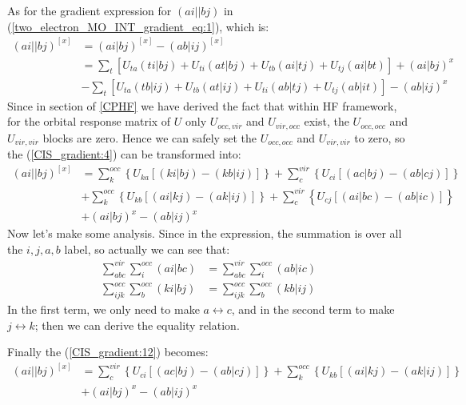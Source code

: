 As for the gradient expression for $(ai||bj)$ in
(\ref{two_electron_MO_INT_gradient_eq:1}), which is:
\begin{align}
 \label{CIS_gradient:4}
(ai||bj)^{[x]} &= (ai|bj)^{[x]} - (ab|ij)^{[x]} \nonumber \\
&= \sum_{t}\left[ 
U_{ta}(ti|bj) +
U_{ti}(at|bj) + 
U_{tb}(ai|tj) + 
U_{tj}(ai|bt)  
\right] + (ai|bj)^{x} \nonumber \\
&-
\sum_{t}\left[ 
U_{ta}(tb|ij) +
U_{tb}(at|ij) + 
U_{ti}(ab|tj) + 
U_{tj}(ab|it)  
\right] - (ab|ij)^{x} 
\end{align}
Since in section of \ref{CPHF} we have derived the fact that within HF
framework, for the orbital response matrix of $U$ only $U_{occ, vir}$ and
$U_{vir, occ}$ exist, the $U_{occ,occ}$ and $U_{vir, vir}$ blocks are zero.
Hence we can safely set the $U_{occ,occ}$ and $U_{vir, vir}$ to zero, so the
(\ref{CIS_gradient:4}) can be transformed into:
\begin{equation}
\begin{split}
(ai||bj)^{[x]} &=
\sum_{k}^{occ}\left\{ U_{ka}\left[(ki|bj) - (kb|ij)\right] \right\} +
\sum_{c}^{vir}\left\{ U_{ci}\left[(ac|bj) - (ab|cj)\right] \right\} \nonumber
\\
&+\sum_{k}^{occ}\left\{ U_{kb}\left[(ai|kj)-(ak|ij)\right] \right\} +
\sum_{c}^{vir}\left\{ U_{cj}\left[(ai|bc)  - (ab|ic)\right] \right\} 
\nonumber \\
&+  (ai|bj)^{x} - (ab|ij)^{x}
\end{split}
 \label{CIS_gradient:12}
\end{equation}
Now let's make some analysis. Since in the expression, the summation is over
all the $i,j,a,b$ label, so actually we can see that:
\begin{align}
\sum_{abc}^{vir}\sum_{i}^{occ}(ai|bc)  &= \sum_{abc}^{vir}\sum_{i}^{occ}(ab|ic)
\nonumber \\
\sum_{ijk}^{occ}\sum_{b}^{occ}(ki|bj) &= \sum_{ijk}^{occ}\sum_{b}^{occ}(kb|ij)
 \label{CIS_gradient:13}
\end{align}
In the first term, we only need to make $a\leftrightarrow c$, and in the second
term to make $j \leftrightarrow k$; then we can derive the equality relation. 

Finally the (\ref{CIS_gradient:12}) becomes:
\begin{equation}
 \begin{split}
 (ai||bj)^{[x]} &=
  \sum_{c}^{vir}\left\{ U_{ci}\left[(ac|bj) - (ab|cj)\right] \right\}
+\sum_{k}^{occ}\left\{ U_{kb}\left[(ai|kj)-(ak|ij)\right] \right\}  \nonumber
\\
&+  (ai|bj)^{x} - (ab|ij)^{x} 
 \end{split}
\label{CIS_gradient:14}
\end{equation}

